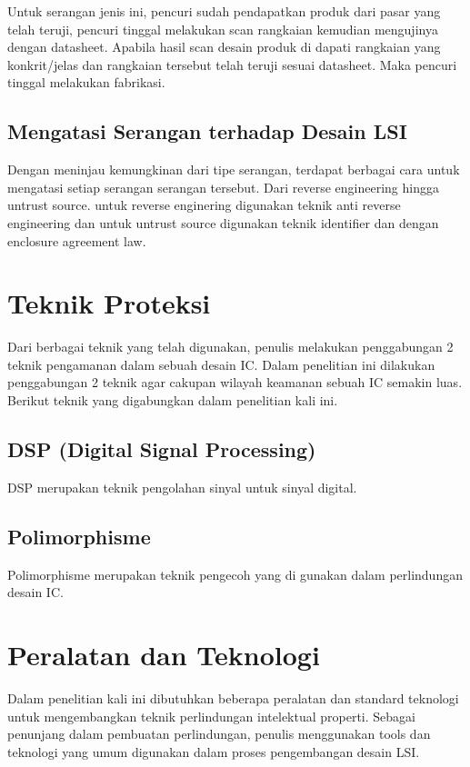Untuk serangan jenis ini, pencuri sudah pendapatkan produk dari pasar yang telah teruji, pencuri tinggal melakukan scan rangkaian kemudian mengujinya dengan datasheet. Apabila hasil scan desain produk di dapati rangkaian yang konkrit/jelas dan rangkaian tersebut telah teruji sesuai datasheet. Maka pencuri tinggal melakukan fabrikasi.

\subsection{Mengatasi Serangan terhadap Desain LSI}
Dengan meninjau kemungkinan dari tipe serangan, terdapat berbagai cara untuk mengatasi setiap serangan serangan tersebut. Dari reverse engineering hingga untrust source. untuk reverse enginering digunakan teknik anti reverse engineering dan untuk untrust source digunakan teknik identifier dan dengan enclosure agreement law.

\section{Teknik Proteksi}
Dari berbagai teknik yang telah digunakan, penulis melakukan penggabungan 2 teknik pengamanan dalam sebuah desain IC. Dalam penelitian ini dilakukan penggabungan 2 teknik agar cakupan wilayah keamanan sebuah IC semakin luas. Berikut teknik yang digabungkan dalam penelitian kali ini.

\subsection{DSP (Digital Signal Processing)}
DSP merupakan teknik pengolahan sinyal untuk sinyal digital.

\subsection{Polimorphisme}
Polimorphisme merupakan teknik pengecoh yang di gunakan dalam perlindungan desain IC. 

\section{Peralatan dan Teknologi}
Dalam penelitian kali ini dibutuhkan beberapa peralatan dan standard teknologi untuk mengembangkan teknik perlindungan intelektual properti. Sebagai penunjang dalam pembuatan perlindungan, penulis menggunakan tools dan teknologi yang umum digunakan dalam proses pengembangan desain LSI.

